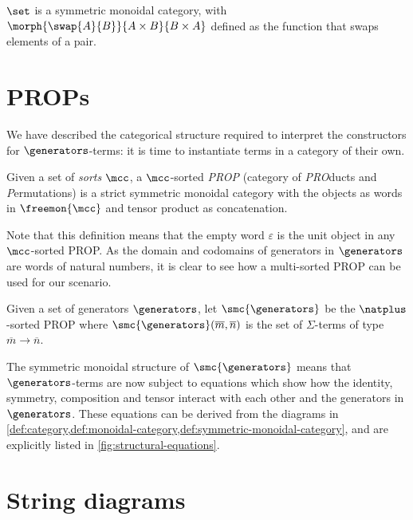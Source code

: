 \begin{example}
    \(\set\) is a symmetric monoidal category, with \(
        \morph{\swap{A}{B}}{A \times B}{B \times A}
    \) defined as the function that swaps elements of a pair.
\end{example}

\section{PROPs}

We have described the categorical structure required to interpret the
constructors for \(\generators\)-terms: it is time to instantiate terms in a
category of their own.

\begin{definition}
    Given a set of \emph{sorts} \(\mcc\), a \(\mcc\)-sorted \emph{PROP}
    (category of \emph{PRO}ducts and \emph{P}ermutations) is a strict symmetric
    monoidal category with the objects as words in \(\freemon{\mcc}\) and tensor
    product as concatenation.
\end{definition}

Note that this definition means that the empty word \(\varepsilon\) is the unit
object in any \(\mcc\)-sorted PROP.
As the domain and codomains of generators in \(\generators\) are words of
natural numbers, it is clear to see how a multi-sorted PROP can be used for our
scenario.

\begin{definition}\label{def:freely-generated-prop}
    Given a set of generators \(\generators\), let \(\smc{\generators}\) be the
    \(\natplus\)-sorted PROP where \(
        \smc{\generators}(\overline{m}, \overline{n})
    \) is the set of \(\Sigma\)-terms of type \(\overline{m} \to \overline{n}\).
\end{definition}

The symmetric monoidal structure of \(\smc{\generators}\) means that
\(\generators\)-terms are now subject to equations which show how the identity,
symmetry, composition and tensor interact with each other and the generators in
\(\generators\).
These equations can be derived from the diagrams in
\cref{def:category,def:monoidal-category,def:symmetric-monoidal-category}, and
are explicitly listed in \cref{fig:structural-equations}.



\section{String diagrams}

